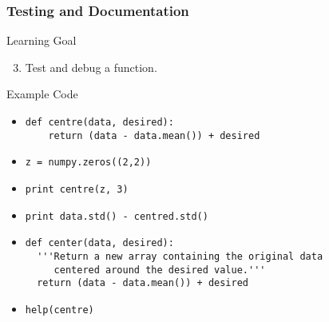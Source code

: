 \documentclass{beamer}
\begin{document}
\begin{frame}[fragile]
\frametitle{Testing and Documentation}
\begin{block}{Learning Goal}
\begin{enumerate}
\setcounter{enumi}{2}
\item    Test and debug a function.
\end{enumerate}
\end{block}
\begin{block}{Example Code}
\small{
\begin{itemize}
\item
\begin{verbatim}
def centre(data, desired):
    return (data - data.mean()) + desired
\end{verbatim}
\item
\begin{verbatim}
z = numpy.zeros((2,2))
\end{verbatim}
\item
\begin{verbatim}
print centre(z, 3)
\end{verbatim}
\item
\begin{verbatim}
print data.std() - centred.std()
\end{verbatim}
\item
\begin{verbatim}
def center(data, desired):
  '''Return a new array containing the original data
     centered around the desired value.'''
  return (data - data.mean()) + desired
\end{verbatim}
\item
\begin{verbatim}
help(centre)
\end{verbatim}
\end{itemize}}
\end{block}
\end{frame}
\end{document}
